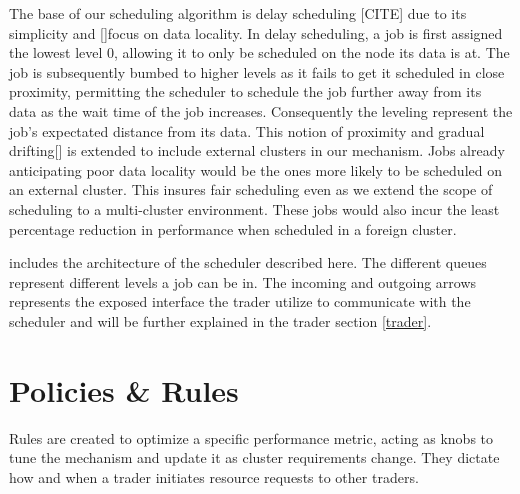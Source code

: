 The base of our scheduling algorithm is delay scheduling [CITE] due to its
simplicity and []focus on data locality. In delay scheduling, a job is first
assigned the lowest level 0, allowing it to only be scheduled on the node its
data is at. The job is subsequently bumbed to higher levels as it fails to get
it scheduled in close proximity, permitting the scheduler to schedule the job
further away from its data as the wait time of the job increases. Consequently
the leveling represent the job's expectated distance from its data. This notion
of proximity and gradual drifting[] is extended to include external clusters in
our mechanism. Jobs already anticipating poor data locality would be the ones
more likely to be scheduled on an external cluster. This insures fair
scheduling even as we extend the scope of scheduling to a multi-cluster
environment. These jobs would also incur the least percentage reduction in
performance when scheduled in a foreign cluster.

 includes the architecture of the scheduler described here. The
different queues represent different levels a job can be in. The incoming and
outgoing arrows represents the exposed interface the trader utilize to
communicate with the scheduler and will be further explained in the trader
section \ref{trader}. 





\section{Policies \& Rules}
Rules are created to optimize a specific performance metric, acting as knobs
to tune the mechanism and update it as cluster requirements change. They 
dictate how and when a trader initiates resource requests to other traders.

